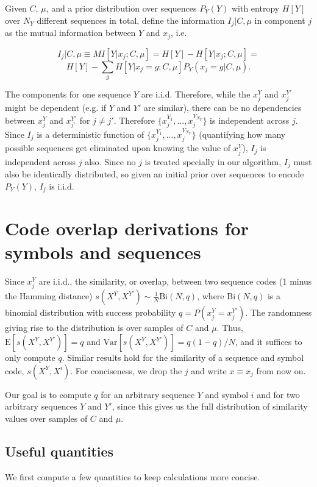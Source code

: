 \documentclass{article}
\begin{document}
\begin{appendices}
Given $C$, $\mu$, and a prior distribution over sequences $P_Y(Y)$ with entropy $H[Y]$ over $N_Y$ different sequences in total, define the information $I_j | C, \mu$ in component $j$ as the mutual information between $Y$ and $x_j$, i.e. 

$$I_j | C, \mu \equiv MI[Y|x_j; C, \mu] = H[Y] - H[Y|x_j; C, \mu] = $$
$$H[Y] - \sum_g H[Y|x_j = g; C, \mu] P_Y(x_j = g| C, \mu).$$

The components for one sequence $Y$ are i.i.d. Therefore, while the $x^Y_j$ and $x^{Y'}_j$ might be dependent (e.g. if $Y$ and $Y'$ are similar), there can be no dependencies between $x^Y_j$ and $x^{Y'}_{j'}$ for $j \neq j'$. Therefore $\{x^{Y_1}_j, ..., x^{Y_{N_Y}}_j\}$ is independent across $j$. Since $I_j$ is a deterministic function of $\{x^{Y_1}_j, ..., x^{Y_{N_Y}}_j\}$ (quantifying how many possible sequences get eliminated upon knowing the value of $x^Y_j$), $I_j$ is independent across $j$ also. Since no $j$ is treated specially in our algorithm, $I_j$ must also be identically distributed, so given an initial prior over sequences to encode $P_Y(Y)$, $I_j$ is i.i.d.

\section{Code overlap derivations for symbols and sequences}

Since $x^Y_j$ are i.i.d., the similarity, or overlap, between two sequence codes  (1 minus the Hamming distance) $s(X^Y, X^{Y'}) \sim \frac{1}{N}\textrm{Bi}(N, q)$, where $\textrm{Bi}(N, q)$ is a binomial distribution with success probability $q = P(x^Y_j = x^{Y'}_j)$. The randomness giving rise to the distribution is over samples of $C$ and $\mu$. Thus, $\textrm{E}[s(X^Y, X^{Y'})] = q$ and $\textrm{Var}[s(X^Y, X^{Y'})] = q(1-q)/N$, and it suffices to only compute $q$. Similar results hold for the similarity of a sequence and symbol code, $s(X^Y, X^i)$. For conciseness, we drop the $j$ and write $x \equiv x_j$ from now on.

Our goal is to compute $q$ for an arbitrary sequence $Y$ and symbol $i$ and for two arbitrary sequences $Y$ and $Y'$, since this gives us the full distribution of similarity values over samples of $C$ and $\mu$.

\subsection{Useful quantities}

We first compute a few quantities to keep calculations more concise.


\end{appendices}
\end{document}
